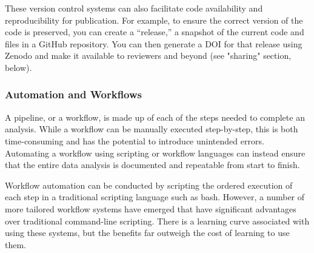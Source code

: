 \documentclass[10pt,letterpaper]{article}
\begin{document}
These version control systems can also facilitate code availability and reproducibility for publication. 
For example, to ensure the correct version of the code is preserved, you can create a “release,” a snapshot of the current code and files in a GitHub repository. 
You can then generate a DOI for that release using Zenodo and make it available to reviewers and beyond (see "sharing" section, below).



\subsubsection*{Automation and Workflows}
A pipeline, or a workflow, is made up of each of the steps needed to complete an analysis.
While a workflow can be manually executed step-by-step, this is both time-consuming and has the potential to introduce unintended errors. 
Automating a workflow using scripting or workflow languages can instead ensure that the entire data analysis is documented and repeatable from start to finish. 

Workflow automation can be conducted by scripting the ordered execution of each step in a traditional scripting language such as bash. 
However, a number of more tailored workflow systems have emerged that have significant advantages over traditional command-line scripting. 
There is a learning curve associated with using these systems, but the benefits far outweigh the cost of learning to use them. 


\end{document}
